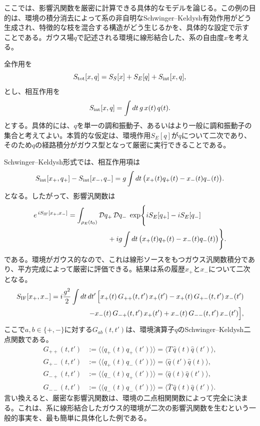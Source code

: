 \documentclass[a4paper,11pt,oneside]{article}
\theoremstyle{definition}
\numberwithin{equation}{section}
\begin{document}
ここでは、影響汎関数を厳密に計算できる具体的なモデルを論じる。この例の目的は、環境の積分消去によって系の非自明なSchwinger--Keldysh有効作用がどう生成され、特徴的な枝を混合する構造がどう生じるかを、具体的な設定で示すことである。ガウス場\(q\)で記述される環境に線形結合した、系の自由度\(x\)を考える。



全作用を
\begin{equation}
S_{\rm tot}[x,q]
=
S_S[x]+S_E[q]+S_{\rm int}[x,q] ,
\end{equation}
とし、相互作用を
\begin{equation}
S_{\rm int}[x,q]
=
\int dt\, g\,x(t)\,q(t) .
\end{equation}
とする。具体的には、\(q\)を単一の調和振動子、あるいはより一般に調和振動子の集合と考えてよい。本質的な仮定は、環境作用\(S_E[q]\)が\(q\)について二次であり、そのため\(q\)の経路積分がガウス型となって厳密に実行できることである。



Schwinger--Keldysh形式では、相互作用項は
\begin{equation}
S_{\rm int}[x_+,q_+]-S_{\rm int}[x_-,q_-]
=
g\int dt\,\bigl(x_+(t)q_+(t)-x_-(t)q_-(t)\bigr) .
\end{equation}
となる。したがって、影響汎関数は
\begin{align}
e^{\,iS_{\rm IF}[x_+,x_-]}
&=
\int_{\rho_E(t_0)} \mathcal D q_+\,\mathcal D q_-\;
\exp\Biggl\{
iS_E[q_+]-iS_E[q_-]
\nonumber\\
&\hspace{2cm}
+i g\int dt\,\bigl(x_+(t)q_+(t)-x_-(t)q_-(t)\bigr)
\Biggr\} .
\end{align}
である。環境がガウス的なので、これは線形ソースをもつガウス汎関数積分であり、平方完成によって厳密に評価できる。結果は系の履歴\(x_+\)と\(x_-\)について二次となる。
\begin{align}\label{IFpmGaussian}
S_{\rm IF}[x_+,x_-]
=
i\frac{g^2}{2}
\int dt\,dt'\,
\Big[
x_+(t)\,G_{++}(t,t')\,x_+(t')
-x_+(t)\,G_{+-}(t,t')\,x_-(t')
\nonumber\\
\hspace{3.7cm}
-x_-(t)\,G_{-+}(t,t')\,x_+(t')
+x_-(t)\,G_{--}(t,t')\,x_-(t')
\Big] ,
\end{align}
ここで\(a,b\in\{+,-\}\)に対する\(G_{ab}(t,t')\)は、環境演算子\(q\)のSchwinger--Keldysh二点関数である。
\begin{align}
G_{++}(t,t')
&:=
\langle\!\langle q_+(t)q_+(t')\rangle\!\rangle
=
\langle T\,\hat q(t)\hat q(t')\rangle ,
\\
G_{+-}(t,t')
&:=
\langle\!\langle q_+(t)q_-(t')\rangle\!\rangle
=
\langle \hat q(t')\hat q(t)\rangle ,
\\
G_{-+}(t,t')
&:=
\langle\!\langle q_-(t)q_+(t')\rangle\!\rangle
=
\langle \hat q(t)\hat q(t')\rangle ,
\\
G_{--}(t,t')
&:=
\langle\!\langle q_-(t)q_-(t')\rangle\!\rangle
=
\langle \bar T\,\hat q(t)\hat q(t')\rangle .
\end{align}
言い換えると、厳密な影響汎関数は、環境の二点相関関数によって完全に決まる。これは、系に線形結合したガウス的環境が二次の影響汎関数を生むという一般的事実を、最も簡単に具体化した例である。\\
\end{document}
